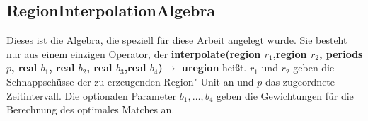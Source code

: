 \subsection{RegionInterpolationAlgebra}

Dieses ist die Algebra, die speziell für diese Arbeit  angelegt wurde. Sie besteht nur aus einem einzigen Operator, der \textbf{interpolate(region  $r_1$,region $r_2$, periods $p$, real $b_1$, real $b_2$, real $b_3$,real $b_4$)$\rightarrow$ uregion} heißt. $r_1$ und $r_2$ geben die Schnappschüsse der zu erzeugenden Region"-Unit an und $p$ das zugeordnete Zeitintervall. Die optionalen Parameter $b_1,\hdots ,b_4$ geben die Gewichtungen für die Berechnung des optimales Matches an.

